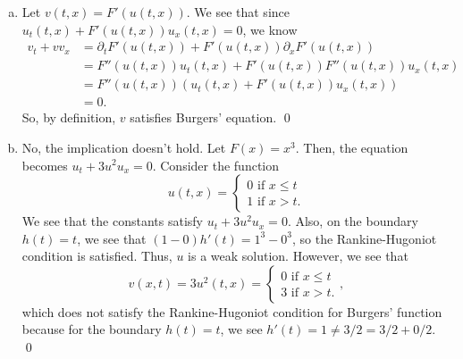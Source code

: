 \documentclass{article}
\renewcommand{\d}{\partial}
\begin{document}
\begin{enumerate}[(a)]
    \item Let $v(t,x) = F'(u(t,x))$. We see that since $u_t(t,x) + F'(u(t,x))u_x(t,x) = 0$, we know 
    \begin{align*}
        v_t + vv_x &= \d_tF'(u(t,x)) + F'(u(t,x))\d_xF'(u(t,x))\\
        &= F''(u(t,x))u_t(t,x) + F'(u(t,x))F''(u(t,x))u_x(t,x) \\
        &=F''(u(t,x))(u_t(t,x) + F'(u(t,x))u_x(t,x))\\
        &= 0.
    \end{align*}
    So, by definition, $v$ satisfies Burgers' equation. \qed
    \item No, the implication doesn't hold. Let $F(x) = x^3$. Then, the equation becomes $u_t + 3u^2u_x = 0$. Consider the function 
    \[u(t,x) = \begin{cases}
        0 \text{ if } x \le t \\
        1 \text{ if } x > t.
    \end{cases}\]
    We see that the constants satisfy $u_t + 3u^2u_x = 0$. Also, on the boundary $h(t) = t$, we see that $(1-0)h'(t) = 1^3 - 0^3$, so the Rankine-Hugoniot condition is satisfied. Thus, $u$ is a weak solution. However, we see that 
    \[v(x,t) = 3u^2(t,x) = \begin{cases}
        0 \text{ if } x \le t \\
        3 \text{ if } x > t.
    \end{cases},\]
    which does not satisfy the Rankine-Hugoniot condition for Burgers' function because for the boundary $h(t) = t$, we see $h'(t) = 1 \ne 3/2 = 3/2+0/2$. \qed 
\end{enumerate}
\end{document}

